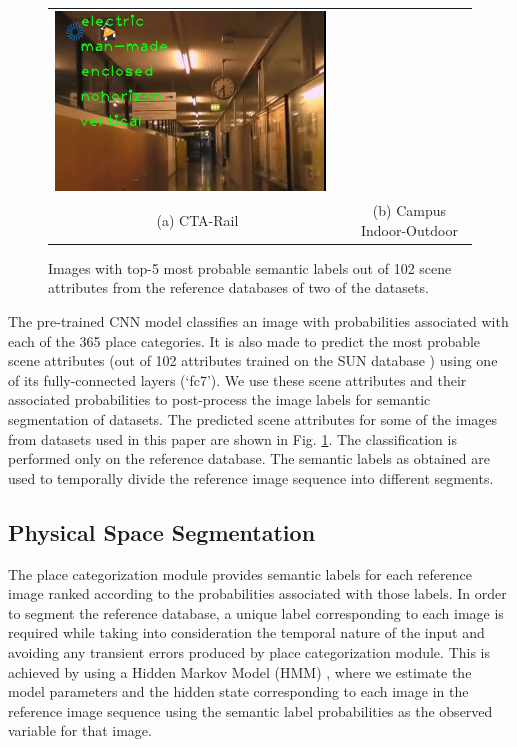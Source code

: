\documentclass[letterpaper, 10 pt, conference]{ieeeconf}  %
\begin{document}
\begin{figure}
\begin{tabular}{p{1.7cm}p{1.7cm}p{1.7cm}p{1.7cm}}
		\includegraphics[width=\widthA,height=\heightA]{3-indoor} \\
		\multicolumn{2}{c}{(a) CTA-Rail} & \multicolumn{2}{c}{(b) Campus Indoor-Outdoor} \\
	\end{tabular}
	\caption{Images with top-5 most probable semantic labels out of 102 scene attributes from the reference databases of two of the datasets.}
	\label{fig:labelledImages}
\end{figure}

The pre-trained CNN model classifies an image with probabilities associated with each of the 365 place categories. It is also made to predict the most probable scene attributes (out of 102 attributes trained on the SUN database \cite{Patterson2012SunAttributes}) using one of its fully-connected layers (`fc7'). We use these scene attributes and their associated probabilities to post-process the image labels for semantic segmentation of datasets. The predicted scene attributes for some of the images from datasets used in this paper are shown in Fig. \ref{fig:labelledImages}. The classification is performed only on the reference database. The semantic labels as obtained are used to temporally divide the reference image sequence into different segments.

\subsection{Physical Space Segmentation}
The place categorization module provides semantic labels for each reference image ranked according to the probabilities associated with those labels. In order to segment the reference database, a unique label corresponding to each image is required while taking into consideration the temporal nature of the input and avoiding any transient errors produced by place categorization module. This is achieved by using a Hidden Markov Model (HMM) \cite{honkela2001nonlinear,hmmlearn}, where we estimate the model parameters and the hidden state corresponding to each image in the reference image sequence using the semantic label probabilities as the observed variable for that image.
\end{document}
